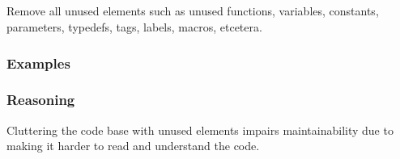 \subsection*{\codingRule{}}

Remove all unused elements such as unused functions, variables, constants, parameters, typedefs, tags, labels, macros, etcetera.

\subsubsection*{Examples}

\subsubsection*{Reasoning}

Cluttering the code base with unused elements impairs maintainability due to making it harder to read and understand the code.